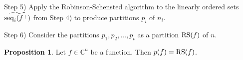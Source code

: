 \documentclass[10pt]{amsart}\oddsidemargin -1mm \evensidemargin -1mm \topmargin -15mm\headheight5mm \headsep 3.5mm \textheight 245mm\textwidth 170mm %
\theoremstyle{definition}\newtheorem{theorem}{Theorem}[section]\newtheorem{lemma}[theorem]{Lemma}\newtheorem{remark}[theorem]{Remark}\newtheorem{proposition}[theorem]{Proposition}\newtheorem{corollary}[theorem]{Corollary}\newtheorem{definition}[theorem]{Definition}\newtheorem{Ex}[theorem]{Example}
\begin{document}




Step 5) Apply the Robinson-Schensted algorithm to the linearly ordered sets $\widetilde{\operatorname{\mathrm{seq}}_i(f^+)}$ from Step 4) to produce partitions $p_i$ of $n_i$.

Step 6) Consider the partitions $p_1, p_2,..., p_t$ as a partition $\operatorname{\mathrm{RS}}(f)$ of $n$.


\begin{proposition}\label{Ppart} Let $f\in\mathbb C^n$ be a function. Then $p(f)=\operatorname{\mathrm{RS}}(f)$.\end{proposition}

\end{document}
